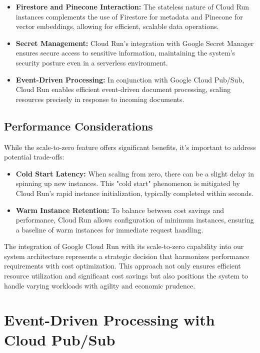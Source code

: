 \documentclass[a4paper, 12pt]{report}
\begin{document}
\begin{itemize}
    \item \textbf{Firestore and Pinecone Interaction:} The stateless nature of Cloud Run instances complements the use of Firestore for metadata and Pinecone for vector embeddings, allowing for efficient, scalable data operations.
    \item \textbf{Secret Management:} Cloud Run's integration with Google Secret Manager ensures secure access to sensitive information, maintaining the system's security posture even in a serverless environment.
    \item \textbf{Event-Driven Processing:} In conjunction with Google Cloud Pub/Sub, Cloud Run enables efficient event-driven document processing, scaling resources precisely in response to incoming documents.
\end{itemize}

\subsection{Performance Considerations}
While the scale-to-zero feature offers significant benefits, it's important to address potential trade-offs:

\begin{itemize}
    \item \textbf{Cold Start Latency:} When scaling from zero, there can be a slight delay in spinning up new instances. This "cold start" phenomenon is mitigated by Cloud Run's rapid instance initialization, typically completed within seconds.
    \item \textbf{Warm Instance Retention:} To balance between cost savings and performance, Cloud Run allows configuration of minimum instances, ensuring a baseline of warm instances for immediate request handling.
\end{itemize}

The integration of Google Cloud Run with its scale-to-zero capability into our system architecture represents a strategic decision that harmonizes performance requirements with cost optimization. This approach not only ensures efficient resource utilization and significant cost savings but also positions the system to handle varying workloads with agility and economic prudence.

\section{Event-Driven Processing with Cloud Pub/Sub}
\end{document}
